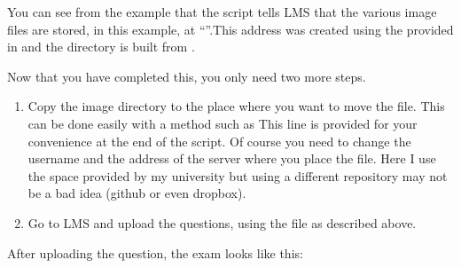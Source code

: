 \documentclass[letterpaper,10pt,english]{sphinxmanual}
\let\sphinxpxdimen\pdfpxdimen\else\newdimen\sphinxpxdimen
\begin{document}
\begin{sphinxVerbatim}[commandchars=\\\{\}]
   
  
\end{sphinxVerbatim}

You can see from the example that the script tells LMS that the various image files are stored, in this example, at “”.This address was created using the  provided in  and the directory is built from .

Now that you have completed this, you only need two more steps.
\begin{enumerate}
%
\item {} 
Copy the image directory to the place where you want to move the file. This can be done easily with a method such as  This line is provided for your convenience at the end of the script. Of course you need to change the username and the address of the server where you place the file. Here I use the space provided by my university but using a different repository may not be a bad idea (github or even dropbox).

\item {} 
Go to LMS and upload the questions, using the file  as described above.

\end{enumerate}

After uploading the question, the exam looks like this:

\noindent\sphinxincludegraphics[width=800\sphinxpxdimen]{{LMS_png_export}.png}
\end{document}
